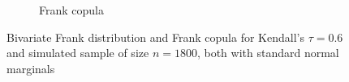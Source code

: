 \begin{figure}[H]
\begin{subfigure}{.45\textwidth}
  \caption{Frank copula}
  \label{fig:frank_copula}
\end{subfigure}
\caption{Bivariate Frank distribution and Frank copula for Kendall's $\tau = 0.6$ and simulated sample of size $n = 1800$, both with standard normal marginals}
\label{fig:frank_plots}
\end{figure}






